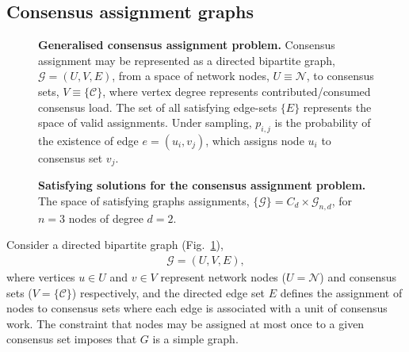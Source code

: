 \subsection{Consensus assignment graphs} \label{sec:assign_graphs}

\begin{figure}[!htb]
	\centering
	
	\caption{\textbf{Generalised consensus assignment problem.} Consensus assignment may be represented as a directed bipartite graph, \mbox{$\mathcal{G}=(U,V,E)$}, from a space of network nodes, $U\equiv\mathcal{N}$, to consensus sets, $V\equiv\{\mathcal{C}\}$, where vertex degree represents contributed/consumed consensus load. The set of all satisfying edge-sets $\{E\}$ represents the space of valid assignments. Under sampling, $p_{i,j}$ is the probability of the existence of edge \mbox{$e=(u_i,v_j)$}, which assigns node $u_i$ to consensus set $v_j$.}\label{fig:bipartite_map}
\end{figure}

\begin{figure}[!htb]
	\centering
	\resizebox{0.3\columnwidth}{!}{}
	\hfill
	\resizebox{0.3\columnwidth}{!}{}
	\hfill
	\resizebox{0.3\columnwidth}{!}{}

	\vspace{10pt}

	\resizebox{0.3\columnwidth}{!}{}
	\hfill
	\resizebox{0.3\columnwidth}{!}{}
	\hfill
	\resizebox{0.3\columnwidth}{!}{}
	\caption{\textbf{Satisfying solutions for the consensus assignment problem.} The space of satisfying graphs assignments, \mbox{$\{\mathcal{G}\} = C_d\times \mathcal{G}_{n,d}$}, for $n=3$ nodes of degree $d=2$.} \label{fig:edge_assignments}
\end{figure}

Consider a directed bipartite graph (Fig.~\ref{fig:bipartite_map}),
\begin{align}
	\mathcal{G} = (U,V,E),
\end{align}
where vertices $u\in U$ and $v\in V$ represent network nodes (\mbox{$U=\mathcal{N}$}) and consensus sets (\mbox{$V=\mathcal{\{\mathcal{C}\}}$}) respectively, and the directed edge set $E$ defines the assignment of nodes to consensus sets where each edge is associated with a unit of consensus work. The constraint that nodes may be assigned at most once to a given consensus set imposes that $G$ is a simple graph.

